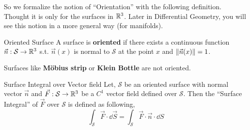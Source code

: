 \documentclass[../Analysis-3]{subfiles}
\begin{document}
So we formalize the notion of ``Orientation'' with the following definition. Thought it is only for the surfaces in $ \mathbb{R}^3 $. Later in Differential Geometry, you will see this notion in a more general way (for manifolds).

\begin{Def}{Oriented Surface}{}
    A surface is \textbf{oriented} if there exists a continuous function $\vec{n} : \mathcal{S} \to \mathbb{R}^3$ s.t. $\vec{n}(x)$ is normal to $\mathcal{S}$ at the point $x$ and $\norm{\vec{n}(x)} = 1$.
\end{Def}

Surfaces like \textbf{Möbius strip} or \textbf{Klein Bottle} are not oriented.

\begin{Def}{Surface Integral over Vector field}{}
    Let, $\mathcal{S}$ be an oriented surface with normal vector $\vec{n}$ and $\vec{F} : \mathcal{S} \to \mathbb{R}^3$ be a $C^1$ vector field defined over $\mathcal{S}$. Then the ``Surface Integral'' of $\vec{F}$ over $\mathcal{S}$ is defined as following,
    \[ \int_{\mathcal{S}} \vec{F} \cdot \dd \vec{S} = \int_{\mathcal{S}} \vec{F}\cdot\vec{n} \cdot \dd S \]
\end{Def}
\end{document}
